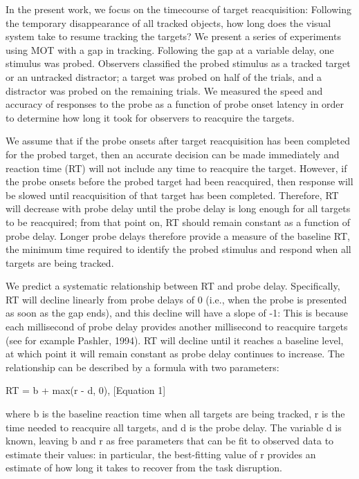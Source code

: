 In the present work, we focus on the timecourse of target reacquisition:
Following the temporary disappearance of all tracked objects, how long does
the visual system take to resume tracking the targets?  We present a series
of experiments using MOT with a gap in tracking.  Following the gap at a
variable delay, one stimulus was probed.  Observers classified the probed
stimulus as a tracked target or an untracked distractor; a target was
probed on half of the trials, and a distractor was probed on the remaining
trials.  We measured the speed and accuracy of responses to the probe as a
function of probe onset latency in order to determine how long it took for
observers to reacquire the targets.

We assume that if the probe onsets after target reacquisition has been
completed for the probed target, then an accurate decision can be made
immediately and reaction time (RT) will not include any time to reacquire
the target.  However, if the probe onsets before the probed target had been
reacquired, then response will be slowed until reacquisition of that target
has been completed.  Therefore, RT will decrease with probe delay until the
probe delay is long enough for all targets to be reacquired; from that
point on, RT should remain constant as a function of probe delay.  Longer
probe delays therefore provide a measure of the baseline RT, the minimum
time required to identify the probed stimulus and respond when all targets
are being tracked.

We predict a systematic relationship between RT and probe delay.
Specifically, RT will decline linearly from probe delays of 0 (i.e., when
the probe is presented as soon as the gap ends), and this decline will have
a slope of -1: This is because each millisecond of probe delay provides
another millisecond to reacquire targets (see for example Pashler, 1994).
RT will decline until it reaches a baseline level, at which point it will
remain constant as probe delay continues to increase.  The relationship can
be described by a formula with two parameters:

RT = b + max(r - d, 0), [Equation 1]

where b is the baseline reaction time when all targets are being tracked, r
is the time needed to reacquire all targets, and d is the probe delay.  The
variable d is known, leaving b and r as free parameters that can be fit to
observed data to estimate their values: in particular, the best-fitting
value of r provides an estimate of how long it takes to recover from the
task disruption.

